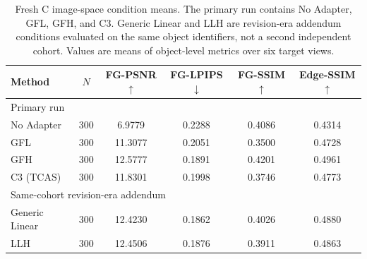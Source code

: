 \documentclass[times,twocolumn,final]{elsarticle}
\providecommand{\DIFadd}[1]{{\protect\color{blue} \sf #1}} %
\providecommand{\DIFaddbegin}{} %
\providecommand{\DIFaddend}{} %
\providecommand{\DIFaddFL}[1]{\DIFadd{#1}} %
\providecommand{\DIFaddbeginFL}{\DIFaddbegin} %
\providecommand{\DIFaddendFL}{\DIFaddend} %
\renewcommand{\DIFaddbeginFL}{}
\renewcommand{\DIFaddendFL}{}
\renewcommand{\DIFaddFL}[1]{#1}
\begin{document}
\begin{table}[t]
\centering
\caption{Fresh C image-space condition means. The primary run contains No Adapter, GFL, GFH, and C3. Generic Linear and LLH are revision-era addendum conditions evaluated on the same object identifiers, not a second independent cohort. Values are means of object-level metrics over six target views.}
\label{tab:freshc-absolute}
\scriptsize\setlength{\tabcolsep}{4pt}
\begin{tabular}{lccccc}
\toprule
\DIFaddFL{Method }& \DIFaddFL{$N$ }& \DIFaddFL{FG-PSNR$\uparrow$ }& \DIFaddFL{FG-LPIPS$\downarrow$ }& \DIFaddendFL FG-SSIM  \DIFaddbeginFL \DIFaddFL{$\uparrow$ }& \DIFaddFL{Edge-SSIM$\uparrow$ }\\
\midrule
\multicolumn{6}{l}{Primary run} \\
\DIFaddFL{No Adapter }& \DIFaddFL{300 }& \DIFaddFL{6.9779 }& \DIFaddFL{0.2288 }& \DIFaddFL{0.4086 }& \DIFaddFL{0.4314 }\\
\DIFaddFL{GFL }& \DIFaddFL{300 }& \DIFaddFL{11.3077 }& \DIFaddFL{0.2051 }& \DIFaddFL{0.3500 }& \DIFaddFL{0.4728 }\\
\DIFaddFL{GFH }& \DIFaddFL{300 }& \DIFaddFL{12.5777 }& \DIFaddFL{0.1891 }& \DIFaddFL{0.4201 }& \DIFaddFL{0.4961 }\\
\DIFaddendFL C3   \DIFaddbeginFL \DIFaddFL{(TCAS) }& \DIFaddFL{300 }& \DIFaddFL{11.8301 }& \DIFaddFL{0.1998 }& \DIFaddFL{0.3746 }& \DIFaddFL{0.4773 }\\
\midrule
\multicolumn{6}{l}{Same-cohort revision-era addendum} \\
\DIFaddFL{Generic Linear }& \DIFaddFL{300 }& \DIFaddFL{12.4230 }& \DIFaddFL{0.1862 }& \DIFaddFL{0.4026 }& \DIFaddFL{0.4880 }\\
\DIFaddFL{LLH }& \DIFaddFL{300 }& \DIFaddFL{12.4506 }& \DIFaddFL{0.1876 }& \DIFaddFL{0.3911 }& \DIFaddFL{0.4863 }\\
\bottomrule
\end{tabular}
\end{table}
\end{document}
